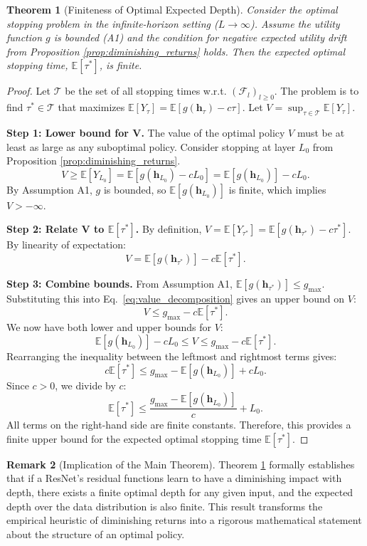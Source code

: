 \documentclass[12pt]{imsart}
\newcommand{\E}{\mathbb{E}}
\newcommand{\F}{\mathcal{F}}
\newcommand{\h}{\mathbf{h}}
\theoremstyle{plain}
\newtheorem{theorem}{Theorem}[section]
\theoremstyle{definition}
\newtheorem{remark}[theorem]{Remark}
\begin{document}
\begin{theorem}[Finiteness of Optimal Expected Depth] \label{thm:finiteness}
Consider the optimal stopping problem in the infinite-horizon setting ($L \to \infty$). Assume the utility function $g$ is bounded (A1) and the condition for negative expected utility drift from Proposition \ref{prop:diminishing_returns} holds. Then the expected optimal stopping time, $\E[\tau^*]$, is finite.
\end{theorem}
\begin{proof}
Let $\mathcal{T}$ be the set of all stopping times w.r.t. $(\F_l)_{l \ge 0}$. The problem is to find $\tau^* \in \mathcal{T}$ that maximizes $\E[Y_\tau] = \E[g(\h_\tau) - c\tau]$. Let $V = \sup_{\tau \in \mathcal{T}} \E[Y_\tau]$.

\textbf{Step 1: Lower bound for V.} The value of the optimal policy $V$ must be at least as large as any suboptimal policy. Consider stopping at layer $L_0$ from Proposition \ref{prop:diminishing_returns}.
\[ V \ge \E[Y_{L_0}] = \E[g(\h_{L_0}) - c L_0] = \E[g(\h_{L_0})] - c L_0. \]
By Assumption A1, $g$ is bounded, so $\E[g(\h_{L_0})]$ is finite, which implies $V > -\infty$.

\textbf{Step 2: Relate V to $\E[\tau^*]$.} By definition, $V = \E[Y_{\tau^*}] = \E[g(\h_{\tau^*}) - c\tau^*]$. By linearity of expectation:
\begin{equation} \label{eq:value_decomposition}
V = \E[g(\h_{\tau^*})] - c\E[\tau^*].
\end{equation}

\textbf{Step 3: Combine bounds.} From Assumption A1, $\E[g(\h_{\tau^*})] \le g_{\max}$. Substituting this into Eq.~\eqref{eq:value_decomposition} gives an upper bound on $V$:
\[ V \le g_{\max} - c\E[\tau^*]. \]
We now have both lower and upper bounds for $V$:
\[ \E[g(\h_{L_0})] - c L_0 \le V \le g_{\max} - c\E[\tau^*]. \]
Rearranging the inequality between the leftmost and rightmost terms gives:
\[ c\E[\tau^*] \le g_{\max} - \E[g(\h_{L_0})] + c L_0. \]
Since $c > 0$, we divide by $c$:
\[ \E[\tau^*] \le \frac{g_{\max} - \E[g(\h_{L_0})]}{c} + L_0. \]
All terms on the right-hand side are finite constants. Therefore, this provides a finite upper bound for the expected optimal stopping time $\E[\tau^*]$.
\end{proof}

\begin{remark}[Implication of the Main Theorem]
Theorem \ref{thm:finiteness} formally establishes that if a ResNet's residual functions learn to have a diminishing impact with depth, there exists a finite optimal depth for any given input, and the expected depth over the data distribution is also finite. This result transforms the empirical heuristic of diminishing returns into a rigorous mathematical statement about the structure of an optimal policy.
\end{remark}
\end{document}
